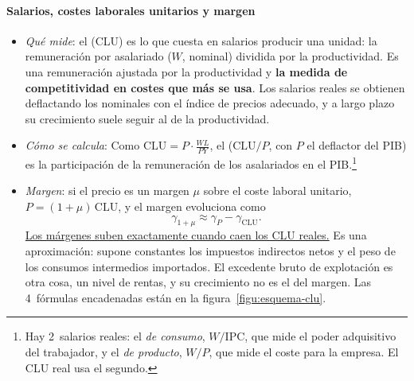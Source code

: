 \documentclass[11pt]{article}
\begin{document}
\paragraph{Salarios, costes laborales unitarios y margen}
\begin{itemize}
\item \emph{Qué mide}: el  (CLU) es lo que cuesta en salarios producir una unidad: la remuneración por asalariado ($W$, nominal) dividida por la productividad. Es una remuneración ajustada por la productividad y \textbf{la medida de competitividad en costes que más se usa}. Los salarios reales se obtienen deflactando los nominales con el índice de precios adecuado, y a largo plazo su crecimiento suele seguir al de la productividad.
\item \emph{Cómo se calcula}:
Como $\mathrm{CLU}=P\cdot\frac{WL}{PY}$, el  ($\mathrm{CLU}/P$, con $P$ el deflactor del PIB) es la participación de la remuneración de los asalariados en el PIB.\footnote{Hay 2~salarios reales: el \emph{de consumo}, $W/\mathrm{IPC}$, que mide el poder adquisitivo del trabajador, y el \emph{de producto}, $W/P$, que mide el coste para la empresa. El CLU real usa el segundo.}
\item \emph{Margen}: si el precio es un margen $\mu$ sobre el coste laboral unitario, $P=(1+\mu)\,\mathrm{CLU}$, y el margen evoluciona como
\[
\gamma_{1+\mu}\approx\gamma_P-\gamma_{\mathrm{CLU}} .
\]
\uline{Los márgenes suben exactamente cuando caen los CLU reales.} Es una aproximación: supone constantes los impuestos indirectos netos y el peso de los consumos intermedios importados. El excedente bruto de explotación es otra cosa, un nivel de rentas, y su crecimiento no es el del margen. Las 4~fórmulas encadenadas están en la figura~\ref{figu:esquema-clu}.
\end{itemize}

\begin{infografia}[!htb]
\centering
\caption{De la productividad al margen: las 4~fórmulas encadenadas}\label{figu:esquema-clu}
\end{infografia}
\end{document}
